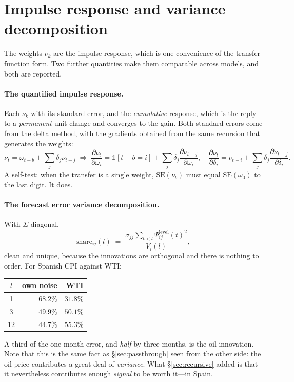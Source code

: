 \documentclass[11pt,a4paper]{article}
\theoremstyle{plain}
\theoremstyle{remark}
\begin{document}
\section{Impulse response and variance decomposition}
\label{sec:irf}

The weights $\nu_k$ are the impulse response, which is one convenience of the
transfer function form. Two further quantities make them comparable across models,
and both are reported.

\paragraph{The quantified impulse response.} Each $\nu_k$ with its standard error,
and the \emph{cumulative} response, which is the reply to a \emph{permanent} unit
change and converges to the gain. Both standard errors come from the delta method,
with the gradients obtained from the same recursion that generates the weights:
\[
\nu_t=\omega_{t-b}+\sum_j \delta_j\nu_{t-j}
\;\Longrightarrow\;
\frac{\partial \nu_t}{\partial \omega_i}=\mathbb{1}[t-b=i]+\sum_j\delta_j\frac{\partial \nu_{t-j}}{\partial\omega_i},
\quad
\frac{\partial \nu_t}{\partial \delta_i}=\nu_{t-i}+\sum_j\delta_j\frac{\partial \nu_{t-j}}{\partial\delta_i}.
\]
A self-test: when the transfer is a single weight, $\mathrm{SE}(\nu_b)$ must equal
$\mathrm{SE}(\omega_0)$ to the last digit. It does.

\paragraph{The forecast error variance decomposition.} With $\Sigma$ diagonal,
\[
\text{share}_{ij}(l) \;=\; \frac{\sigma_{jj}\sum_{t<l}\Psi^{\text{level}}_{ij}(t)^2}{V_i(l)},
\]
clean and unique, because the innovations are orthogonal and there is nothing to
order. For Spanish CPI against WTI:

\begin{center}
\begin{tabular}{crr}
\toprule
$l$ & own noise & \textbf{WTI} \\
\midrule
 1 & $68.2\%$ & $\mathbf{31.8\%}$ \\
 3 & $49.9\%$ & $\mathbf{50.1\%}$ \\
12 & $44.7\%$ & $\mathbf{55.3\%}$ \\
\bottomrule
\end{tabular}
\end{center}

A third of the one-month error, and \emph{half} by three months, is the oil
innovation. Note that this is the same fact as \S\ref{sec:passthrough} seen from
the other side: the oil price contributes a great deal of \emph{variance}. What
\S\ref{sec:recursive} added is that it nevertheless contributes enough
\emph{signal} to be worth it---in Spain.
\end{document}
